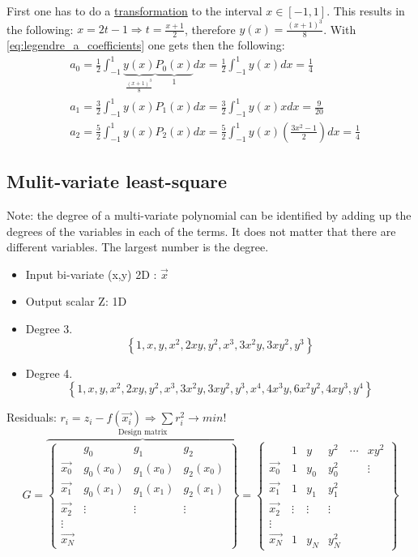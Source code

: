 First one has to do a \href{https://borea17.github.io/ML_101/probability_theory/remap-numbers-in-interval}{transformation} to the interval $x \in[-1,1]$. This results in the following: $x=2 t-1 \Rightarrow t=\frac{x+1}{2}$, therefore $y(x)=\frac{(x+1)^3}{8}$. With \autoref{eq:legendre_a_coefficients} one gets then the following:
$$
\begin{aligned}
& a_0=\frac{1}{2} \int_{-1}^1 \underbrace{y(x)}_{\frac{(x+1)^3}{8}} \underbrace{P_0(x)}_{1} d x=\frac{1}{2} \int_{-1}^1 y(x) d x=\frac{1}{4} \\
& a_1=\frac{3}{2} \int_{-1}^1 y(x) P_1(x) d x=\frac{3}{2} \int_{-1}^1 y(x) x d x=\frac{9}{20} \\
& a_2=\frac{5}{2} \int_{-1}^1 y(x) P_2(x) d x=\frac{5}{2} \int_{-1}^1 y(x)\left(\frac{3 x^2-1}{2}\right) d x=\frac{1}{4}
\end{aligned}
$$
\subsection{Mulit-variate least-square}
Note: the degree of a multi-variate polynomial can be identified by adding up the degrees of the variables in each of the terms. It does not matter that there are different variables. The largest number is the degree.
\begin{itemize}
    \item Input bi-variate (x,y) 2D : $\Vec{x}$
    \item Output scalar Z: 1D
\end{itemize}

\begin{itemize}
    \item Degree 3. 
    $$
    \left\{1, x, y, x^{2}, 2 x y, y^{2}, x^{3}, 3 x^{2} y, 3 x y^{2}, y^{3}\right\}
    $$
    \item Degree 4. 
    $$
    \left\{1, x, y, x^{2}, 2 x y, y^{2}, x^{3}, 3 x^{2} y, 3 x y^{2}, y^{3}, x^{4}, 4 x^{3} y, 6 x^{2} y^{2}, 4 x y^{3}, y^{4}\right\}
    $$
\end{itemize}
Residuals: $r_i=z_i-f(\Vec{x_i}) \Rightarrow \sum r_i^2 \rightarrow min!$
$$
G=
\overbrace{\left\{\begin{array}{c|ccc}
 & g_0 & g_1 & g_2 \\
\hline 
\vec{x_0} & g_0\left(x_0\right) & g_1\left(x_0\right) & g_2\left(x_0\right) \\
\vec{x_1} & g_0\left(x_1\right) & g_1\left(x_1\right) & g_2\left(x_1\right)\\
\vec{x_2} &\vdots&\vdots&\vdots \\
\vdots    &  \\
\vec{x_N} &  
\end{array}\right\}}^{\text{Design matrix}}=
\left\{\begin{array}{c|ccccc}
 & 1 & y & y^2 & \cdots & xy^2 \\
\hline 
\vec{x_0} & 1 & y_0 & y_0^2 &~&\vdots\\
\vec{x_1} & 1 & y_1 & y_1^2\\
\vec{x_2} &\vdots&\vdots&\vdots \\
\vdots    &  \\
\vec{x_N} & 1 & y_N & y_N^2
\end{array}\right\}
$$
